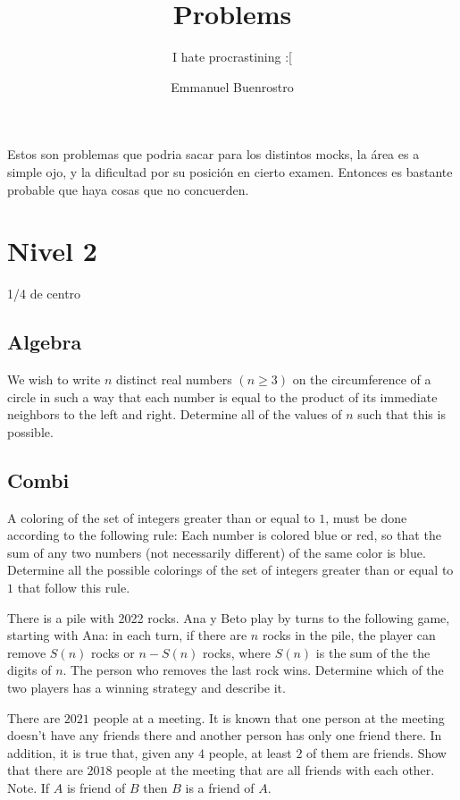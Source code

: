 \documentclass[11pt]{scrartcl}
\title {Problems}
\subtitle{I hate procrastining :[}
\author{Emmanuel Buenrostro}
\begin{document}
\maketitle
\tableofcontents

Estos son problemas que podria sacar para los distintos mocks, la \'area es a simple ojo, y la dificultad por su posici\'on en cierto examen. Entonces es bastante probable que haya cosas que no concuerden.

\section{Nivel 2}
1/4 de centro
\subsection{Algebra}

\begin{problem}[Centro 2015/1]
We wish to write $n$ distinct real numbers $(n\geq3)$ on the circumference of a circle in such a way that each number is equal to the product of its immediate neighbors to the left and right. Determine all of the values of $n$ such that this is possible.
\end{problem}

\subsection{Combi}

\begin{problem} [Centro 2023/1]
	A coloring of the set of integers greater than or equal to $1$, must be done according to the following rule: Each number is colored blue or red, so that the sum of any two numbers (not necessarily different) of the same color is blue. Determine all the possible colorings of the set of integers greater than or equal to $1$ that follow this rule.
\end{problem}

\begin{problem} [Centro 2022/1]
There is a pile with 2022 rocks. Ana y Beto play by turns to the following game, starting with Ana: in each turn, if there are $n$ rocks in the pile, the player can remove $S(n)$ rocks or $n-S(n)$ rocks, where $S(n)$ is the sum of the the digits of $n$. The person who removes the last rock wins. Determine which of the two players has a winning strategy and describe it.
\end{problem}


\begin{problem} [Centro 2021/4]
There are $2021$ people at a meeting. It is known that one person at the meeting doesn't have any friends there and another person has only one friend there. In addition, it is true that, given any $4$ people, at least $2$ of them are friends. Show that there are $2018$ people at the meeting that are all friends with each other.
Note. If $A$ is friend of $B$ then $B$ is a friend of $A$.
\end{problem}
\end{document}
